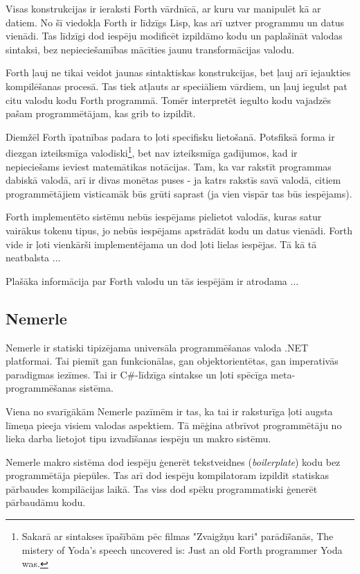 Visas konstrukcijas ir ieraksti Forth vārdnīcā, ar kuru var manipulēt kā ar datiem. No šī viedokļa Forth ir līdzīgs Lisp, kas arī uztver programmu un datus vienādi. Tas līdzīgi dod iespēju modificēt izpildāmo kodu un paplašināt valodas sintaksi, bez nepieciešamības mācīties jaunu transformācijas valodu.

Forth ļauj ne tikai veidot jaunas sintaktiskas konstrukcijas, bet ļauj arī iejaukties kompilēšanas procesā. Tas tiek atļauts ar speciāliem vārdiem, un ļauj iegulst pat citu valodu kodu Forth programmā. Tomēr interpretēt iegulto kodu vajadzēs pašam programmētājam, kas grib to izpildīt.

Diemžēl Forth īpatnības padara to ļoti specifisku lietošanā. Potsfiksā forma ir diezgan izteiksmīga valodiski\footnote{Sakarā ar sintakses īpašībām pēc filmas "Zvaigžņu kari" parādīšanās,  The mistery of Yoda’s speech uncovered is: Just an old Forth programmer Yoda was.}, bet nav izteiksmīga gadījumos, kad ir nepieciešams ieviest matemātikas notācijas. Tam, ka var rakstīt programmas dabiskā valodā, arī ir divas monētas puses - ja katrs rakstīs savā valodā, citiem programmētājiem visticamāk būs grūti saprast (ja vien vispār tas būs iespējams).

Forth implementēto sistēmu nebūs iespējams pielietot valodās, kuras satur vairākus tokenu tipus, jo nebūs iespējams apstrādāt kodu un datus vienādi. Forth vide ir ļoti vienkārši implementējama un dod ļoti lielas iespējas. Tā kā tā neatbalsta ...

Plašāka informācija par Forth valodu un tās iespējām ir atrodama ...


\subsection{\label{sbs:rel_nemerle}Nemerle}

Nemerle ir statiski tipizējama universāla programmēšanas valoda .NET platformai. Tai piemīt gan funkcionālas, gan objektorientētas, gan imperativās paradigmas iezīmes. Tai ir C\#-līdzīga sintakse un ļoti spēcīga meta-programmēšanas sistēma.

Viena no svarīgākām Nemerle pazīmēm ir tas, ka tai ir raksturīga ļoti augsta līmeņa pieeja visiem valodas aspektiem. Tā mēģina atbrīvot programmētāju no lieka darba lietojot tipu izvadīšanas iespēju un makro sistēmu.

Nemerle makro sistēma dod iespēju ģenerēt tekstveidnes (\emph{boilerplate}) kodu bez programmētāja piepūles. Tas arī dod iespēju kompilatoram izpildīt statiskas pārbaudes kompilācijas laikā. Tas viss dod spēku programmatiski ģenerēt pārbaudāmu kodu.


